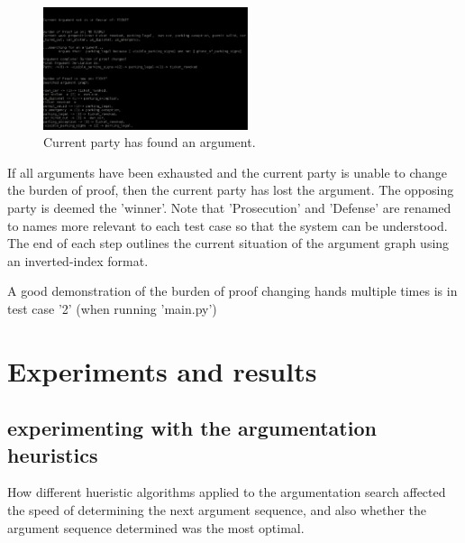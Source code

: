 \documentclass[10pt,a4paper,twocolumn]{article}
\begin{document}
\begin{figure}[h!]
	\label{screen2}
	\includegraphics[width=6cm]{images/screeen2.png}
	\centering
	\caption{Current party has found an argument.}
\end{figure}

If all arguments have been exhausted and the current party is unable to change
the burden of proof, then the current party has lost the argument. The opposing
party is deemed the 'winner'. Note that 'Prosecution' and 'Defense' are renamed
to names more relevant to each test case so that the system can be understood.
The end of each step outlines the current situation of the argument graph using
an inverted-index format.

A good demonstration of the burden of proof changing hands multiple times is in
test case '2' (when running 'main.py')

\section{Experiments and results}

\subsection{experimenting with the argumentation heuristics}
How different hueristic algorithms applied to the argumentation search affected
the speed of determining the next argument sequence, and also whether the
argument sequence determined was the most optimal.
\end{document}
